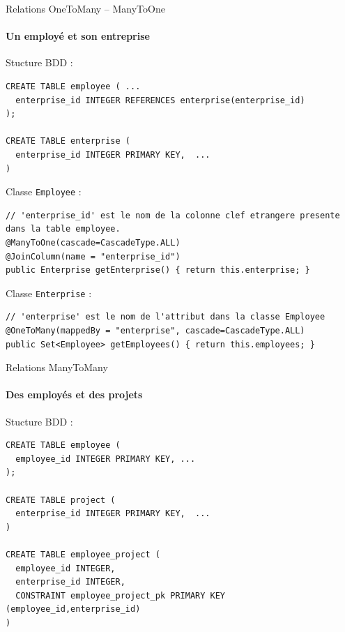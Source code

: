\documentclass[compress]{beamer}%
\begin{document}
\begin{frame}[fragile]{Relations OneToMany -- ManyToOne}
	\framesubtitle{Un employé et son entreprise}
	
	Stucture BDD :	
	\begin{lstlisting}
CREATE TABLE employee ( ...
  enterprise_id INTEGER REFERENCES enterprise(enterprise_id)
);

CREATE TABLE enterprise (
  enterprise_id INTEGER PRIMARY KEY,  ...
)
	\end{lstlisting}
	
	\pause
	Classe \texttt{Employee} : 
	\begin{lstlisting}
// 'enterprise_id' est le nom de la colonne clef etrangere presente dans la table employee.
@ManyToOne(cascade=CascadeType.ALL)
@JoinColumn(name = "enterprise_id")
public Enterprise getEnterprise() { return this.enterprise; }
	\end{lstlisting}
	
	\pause
	Classe \texttt{Enterprise} :
	\begin{lstlisting}
// 'enterprise' est le nom de l'attribut dans la classe Employee
@OneToMany(mappedBy = "enterprise", cascade=CascadeType.ALL)
public Set<Employee> getEmployees() { return this.employees; }
	\end{lstlisting}

\end{frame}

\begin{frame}[containsverbatim]{Relations ManyToMany}
	\framesubtitle{Des employés et des projets}
	
	Stucture BDD :	
	\begin{lstlisting}
CREATE TABLE employee (
  employee_id INTEGER PRIMARY KEY, ...
);

CREATE TABLE project (
  enterprise_id INTEGER PRIMARY KEY,  ...
)

CREATE TABLE employee_project (
  employee_id INTEGER,
  enterprise_id INTEGER,
  CONSTRAINT employee_project_pk PRIMARY KEY (employee_id,enterprise_id)
)
	\end{lstlisting}
	

\end{frame}
\end{document}
